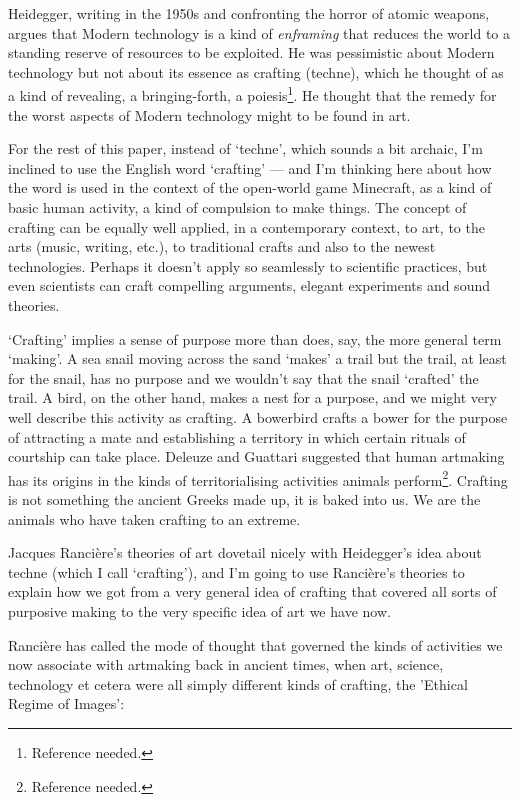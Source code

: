 \documentclass[letterpaper]{article}
\begin{document}
    Heidegger, writing in the 1950s and confronting the horror of atomic weapons, argues that Modern technology is a kind of \emph{enframing} that reduces the world to a standing reserve of resources to be exploited. He was pessimistic about Modern technology but not about its essence as crafting (techne), which he thought of as a kind of revealing, a bringing-forth, a poiesis\footnote{Reference needed.}. He thought that the remedy for the worst aspects of Modern technology might to be found in art.
    
    For the rest of this paper, instead of ‘techne’, which sounds a bit archaic, I'm inclined to use the English word ‘crafting’ — and I'm thinking here about how the word is used in the context of the open-world game Minecraft, as a kind of basic human activity, a kind of compulsion to make things. The concept of crafting can be equally well applied, in a contemporary context, to art, to the arts (music, writing, etc.), to traditional crafts and also to the newest technologies. Perhaps it doesn't apply so seamlessly to scientific practices, but even scientists can craft compelling arguments, elegant experiments and sound theories.

    ‘Crafting’ implies a sense of purpose more than does, say, the more general term ‘making’. A sea snail moving across the sand ‘makes’ a trail but the trail, at least for the snail, has no purpose and we wouldn't say that the snail ‘crafted’ the trail. A bird, on the other hand, makes a nest for a purpose, and we might very well describe this activity as crafting. A bowerbird crafts a bower for the purpose of attracting a mate and establishing a territory in which certain rituals of courtship can take place. Deleuze and Guattari suggested that human artmaking has its origins in the kinds of territorialising activities animals perform\footnote{Reference needed.}. Crafting is not something the ancient Greeks made up, it is baked into us. We are the animals who have taken crafting to an extreme.

    Jacques Rancière's theories of art dovetail nicely with Heidegger's idea about techne (which I call ‘crafting’), and I'm going to use Rancière's theories to explain how we got from a very general idea of crafting that covered all sorts of purposive making to the very specific idea of art we have now.
    
    Rancière has called the mode of thought that governed the kinds of activities we now associate with artmaking back in ancient times, when art, science, technology et cetera were all simply different kinds of crafting, the ’Ethical Regime of Images’:
\end{document}
